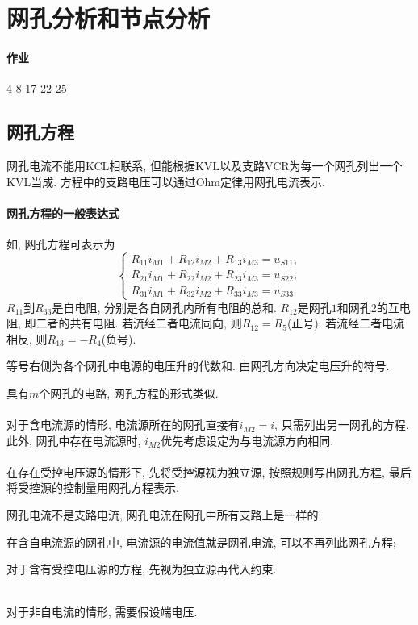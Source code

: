 \documentclass{ctexart}
\begin{document}
\section{网孔分析和节点分析} %
\label{sec:网孔分析和节点分析}

\paragraph{作业} %
\label{par:作业}

4 8 17 22 25


\subsection{网孔方程} %
\label{sub:网孔方程}

网孔电流不能用KCL相联系, 但能根据KVL以及支路VCR为每一个网孔列出一个KVL当成. 方程中的支路电压可以通过Ohm定律用网孔电流表示.
\paragraph{网孔方程的一般表达式} %
\label{par:网孔方程的一般表达式}

如, 网孔方程可表示为
\[ \begin{cases}
    R_{11} i_{M1} +  R_{12}i_{M2} + R_{13} i_{M3} = u_{S11},\\
    R_{21} i_{M1} +  R_{22}i_{M2} + R_{23} i_{M3} = u_{S22}, \\
    R_{31} i_{M1} +  R_{32}i_{M2} + R_{33} i_{M3} = u_{S33}.
\end{cases} \]
$R_11$到$R_33$是自电阻, 分别是各自网孔内所有电阻的总和. $R_{12}$是网孔$1$和网孔$2$的互电阻, 即二者的共有电阻. 若流经二者电流同向, 则$R_{12} = R_5$(正号). 若流经二者电流相反, 则$R_{13} = -R_4$(负号).
\par
等号右侧为各个网孔中电源的电压升的代数和. 由网孔方向决定电压升的符号.
\par
具有$m$个网孔的电路, 网孔方程的形式类似.
\\
\\
对于含电流源的情形, 电流源所在的网孔直接有$i_{M2} = i$, 只需列出另一网孔的方程. 此外, 网孔中存在电流源时, $i_{M2}$优先考虑设定为与电流源方向相同.\\
\\
在存在受控电压源的情形下, 先将受控源视为独立源, 按照规则写出网孔方程, 最后将受控源的控制量用网孔方程表示.
\begin{cenum}
    \item 网孔电流不是支路电流, 网孔电流在网孔中所有支路上是一样的;
    \item 在含自电流源的网孔中, 电流源的电流值就是网孔电流, 可以不再列此网孔方程;
    \item 对于含有受控电压源的方程, 先视为独立源再代入约束.
\end{cenum}
\\
对于非自电流的情形, 需要假设端电压. 
\end{document}
